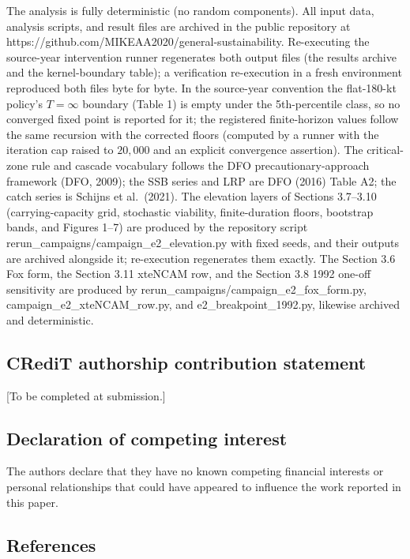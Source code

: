 \documentclass[11pt]{article}
\begin{document}
The analysis is fully deterministic (no random components). All input
data, analysis scripts, and result files are archived in the public
repository at https://github.com/MIKEAA2020/general-sustainability.
Re-executing the source-year intervention runner regenerates both output
files (the results archive and the kernel-boundary table); a
verification re-execution in a fresh environment reproduced both files
byte for byte. In the source-year convention the flat-180-kt policy's
\(T=\infty\) boundary (Table 1) is empty under the 5th-percentile class,
so no converged fixed point is reported for it; the registered
finite-horizon values follow the same recursion with the corrected
floors (computed by a runner with the iteration cap raised to
\(20{,}000\) and an explicit convergence assertion). The critical-zone
rule and cascade vocabulary follows the DFO precautionary-approach
framework (DFO, 2009); the SSB series and LRP are DFO (2016) Table A2;
the catch series is Schijns et al.~(2021). The elevation layers of
Sections 3.7--3.10 (carrying-capacity grid, stochastic viability,
finite-duration floors, bootstrap bands, and Figures 1--7) are produced
by the repository script rerun\_campaigns/campaign\_e2\_elevation.py
with fixed seeds, and their outputs are archived alongside it;
re-execution regenerates them exactly. The Section 3.6 Fox form, the
Section 3.11 xteNCAM row, and the Section 3.8 1992 one-off sensitivity
are produced by rerun\_campaigns/campaign\_e2\_fox\_form.py,
campaign\_e2\_xteNCAM\_row.py, and e2\_breakpoint\_1992.py, likewise
archived and deterministic.

\subsection{CRediT authorship contribution
statement}\label{credit-authorship-contribution-statement}

{[}To be completed at submission.{]}

\subsection{Declaration of competing
interest}\label{declaration-of-competing-interest}

The authors declare that they have no known competing financial
interests or personal relationships that could have appeared to
influence the work reported in this paper.

\subsection{References}\label{references}
\end{document}
